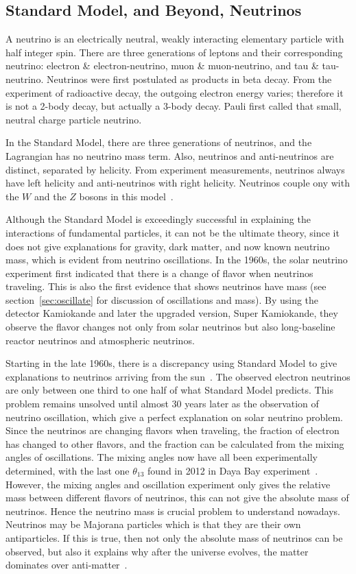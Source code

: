 \documentclass[aps,prd,twocolumn,nofootinbib]{revtex4-1}
\begin{document}
\subsection{Standard Model, and Beyond, Neutrinos}
A neutrino is an electrically neutral, weakly interacting elementary particle with half integer spin. There are three generations of leptons and their corresponding neutrino: electron \& electron-neutrino, muon \& muon-neutrino, and tau \& tau-neutrino. Neutrinos were first postulated as products in beta decay. From the experiment of radioactive decay, the outgoing electron energy varies; therefore it is not a 2-body decay, but actually a 3-body decay. Pauli first called that small, neutral charge particle neutrino.

In the Standard Model, there are three generations of neutrinos, and the Lagrangian has no neutrino mass term. Also, neutrinos and anti-neutrinos are distinct, separated by helicity. From experiment measurements, neutrinos always have left helicity and anti-neutrinos with right helicity. Neutrinos couple ony with the $W$ and the $Z$ bosons in this model~\cite{ping1}.

Although the Standard Model is exceedingly successful in explaining the interactions of fundamental particles, it can not be the ultimate theory, since it does not give explanations for gravity, dark matter, and now known neutrino mass, which is evident from neutrino oscillations. In the 1960s, the solar neutrino experiment first indicated that there is a change of flavor when neutrinos traveling. This is also the first evidence that shows neutrinos have mass (see section~\ref{sec:oscillate} for discussion of oscillations and mass). By using the detector Kamiokande and later the upgraded version, Super Kamiokande, they observe the flavor changes not only from solar neutrinos but also long-baseline reactor neutrinos and atmospheric neutrinos.

Starting in the late 1960s, there is a discrepancy using Standard Model to give explanations to neutrinos arriving from the sun~\cite{ping2}. The observed electron neutrinos are only between one third to one half of what Standard Model predicts. This problem remains unsolved until almost 30 years later as the observation of neutrino oscillation, which give a perfect explanation on solar neutrino problem. Since the neutrinos are changing flavors when traveling, the fraction of electron has changed to other flavors, and the fraction can be calculated from the mixing angles of oscillations. The mixing angles now have all been experimentally determined, with the last one $\theta_{13}$ found in 2012 in Daya Bay experiment~\cite{ping3}. However, the mixing angles and oscillation experiment only gives the relative mass between different flavors of neutrinos, this can not give the absolute mass of neutrinos. Hence the neutrino mass is crucial problem to understand nowadays. Neutrinos may be Majorana particles which is that they are their own antiparticles. If this is true, then not only the absolute mass of neutrinos can be observed, but also it explains why after the universe evolves, the matter dominates over anti-matter~\cite{ping4}.
\end{document}
